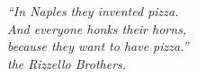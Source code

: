 \begin{recipeblock}
\small	\noindent \textit{``In Naples they invented pizza. \\
		And everyone honks their horns, \\
		because they want to have pizza.'' \\ \normalfont \hspace{1.5cm} \textemdash the Rizzello Brothers.}
\end{recipeblock}
